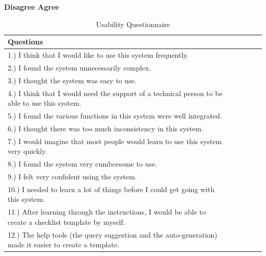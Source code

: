 \begin{table}[ht!]
    \centering
    \footnotesize
    \hspace*{\fill} \textbf{Disagree \qquad\quad\>\>\> Agree}
    \begin{tabular}{
      |p{}%
      |p{}%
      |p{}%
      |p{}%
      |p{}%
      |p{}|%
      }
      \hline
      \centering Questions & \centering 1 & \centering 2 & \centering 3 & \centering 4 & \centering\arraybackslash 5     \\ \hline
      1.) I think that I would like to use this system frequently. &  & & &  & \\ \hline
      2.) I found the system unnecessarily complex. &  & & &  & \\ \hline
      3.) I thought the system was easy to use. &  & & &  & \\ \hline
      4.) I think that I would need the support of a technical person to be able to use this system. &  & & &  & \\ \hline
      5.) I found the various functions in this system were well integrated. &  & & &  & \\ \hline
      6.) I thought there was too much inconsistency in this system. &  & & &  & \\ \hline
      7.) I would imagine that most people would learn to use this system very quickly. &  & & &  & \\ \hline
      8.) I found the system very cumbersome to use. &  & & &  & \\ \hline
      9.) I felt very confident using the system. &  & & &  & \\ \hline
      10.) I needed to learn a lot of things before I could get going with this system. &  & & &  & \\ \hline
      11.) After learning through the instructions, I would be able to create a checklist template by myself. &  & & &  & \\ \hline
      12.) The help tools (the query suggestion and the auto-generation) made it easier to create a template. &  & & &  & \\ \hline
    \end{tabular}
    \caption{Usability Questionnaire}
    \label{tab:usability}
\end{table}

